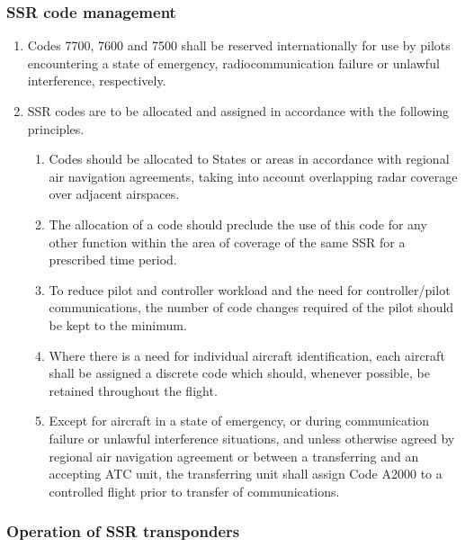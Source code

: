 \subsubsection{SSR code management}

\begin{enumerate}
    \item Codes 7700, 7600 and 7500 shall be reserved internationally for use by pilots encountering a state of emergency, radiocommunication failure or unlawful interference, respectively.
    \item SSR codes are to be allocated and assigned in accordance with the following principles.
    
    \begin{enumerate}
        \item Codes should be allocated to States or areas in accordance with regional air navigation agreements, taking into account overlapping radar coverage over adjacent airspaces.
        \item The allocation of a code should preclude the use of this code for any other function within the area of coverage of the same SSR for a prescribed time period.
        \item To reduce pilot and controller workload and the need for controller/pilot communications, the number of code changes required of the pilot should be kept to the minimum.
        \item Where there is a need for individual aircraft identification, each aircraft shall be assigned a discrete code which should, whenever possible, be retained throughout the flight.
        \item Except for aircraft in a state of emergency, or during communication failure or unlawful interference situations, and unless otherwise agreed by regional air navigation agreement or between a transferring and an accepting ATC unit, the transferring unit shall assign Code A2000 to a controlled flight prior to transfer of communications.
    \end{enumerate}

\end{enumerate}

\subsubsection{Operation of SSR transponders}

